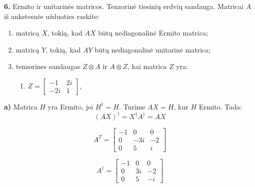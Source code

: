\documentclass{article}
\begin{document}

\pagebreak
\textbf{6.} Ermito ir unitarinės matricos. Tenzorinė tiesinių erdvių sandauga. Matricai $A$ iš ankstesnės užduoties raskite:

\begin{enumerate}[label=\alph*)]
    \item matricą $X$, tokią, kad $AX$ būtų nediagonalinė Ermito matrica;
    \item matricą $Y$, tokią, kad $AY$ būtų nediagonalinė unitarinė matrica;
    \item tenzorines sandaugas $Z \otimes A$ ir $A \otimes Z$, kai matrica $Z$ yra:
    \begin{enumerate}[label=\arabic*.]
        \item $Z = \begin{bmatrix} -1 & 2i \\ -2i & 1 \end{bmatrix}$,
    \end{enumerate}
\end{enumerate}


\textbf{a)} Matrica $H$ yra Ermito, jei $H^{\dag} = H$.
Turime $AX = H$, kur $H$ Ermito. 
Tada:
\[
    (AX)^\dag = X^\dag A^\dag = AX
\]

\[
A^T=
\begin{bmatrix}
    -1 & 0 & 0 \\
    0 & -3i & -2 \\
    0 & 5 & i
\end{bmatrix}
\]

\[
A^\dag=
\begin{bmatrix}
    -1 & 0 & 0 \\
    0 & 3i & -2 \\
    0 & 5 & -i
\end{bmatrix}
\]
\end{document}
